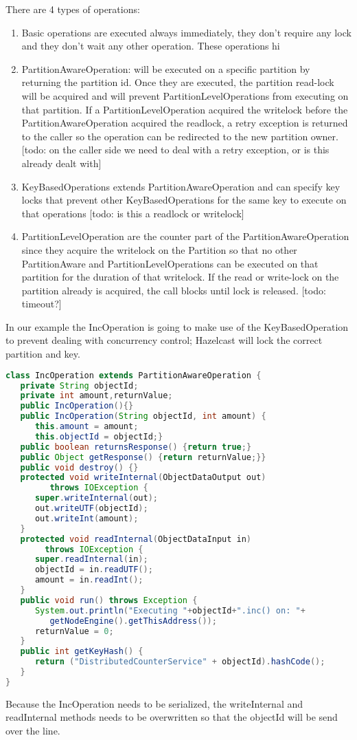 There are 4 types of operations:
\begin{enumerate}
\item Basic operations are executed always immediately, they don't require any lock and they don't wait any other operation. These operations hi
\item PartitionAwareOperation: will be executed on a specific partition by returning the partition id. Once they are executed, the partition read-lock will be acquired and will prevent PartitionLevelOperations from executing on that partition. If a PartitionLevelOperation acquired the writelock before the PartitionAwareOperation acquired the readlock, a retry exception is returned to the caller so the operation can be redirected to the new partition owner. [todo: on the caller side we need to deal with a retry exception, or is this already dealt with]
\item KeyBasedOperations extends PartitionAwareOperation and can specify key locks that prevent other KeyBasedOperations for the same key to execute on that operations [todo: is this a readlock or writelock]
\item PartitionLevelOperation are the counter part of the PartitionAwareOperation since they acquire the writelock on the Partition so that no other PartitionAware and PartitionLevelOperations can be executed on that partition for the duration of that writelock. If the read or write-lock on the partition already is acquired, the call blocks until lock is released. [todo: timeout?]
\end{enumerate}
In our example the IncOperation is going to make use of the KeyBasedOperation to prevent dealing with concurrency control; Hazelcast will lock the correct partition and key. 

\begin{lstlisting}[language=java]
class IncOperation extends PartitionAwareOperation {
   private String objectId;
   private int amount,returnValue;
   public IncOperation(){}
   public IncOperation(String objectId, int amount) {
      this.amount = amount;
      this.objectId = objectId;}
   public boolean returnsResponse() {return true;}
   public Object getResponse() {return returnValue;}}
   public void destroy() {}
   protected void writeInternal(ObjectDataOutput out) 
         throws IOException {
      super.writeInternal(out);
      out.writeUTF(objectId);
      out.writeInt(amount);
   }
   protected void readInternal(ObjectDataInput in) 
        throws IOException {
      super.readInternal(in);
      objectId = in.readUTF();
      amount = in.readInt();
   }
   public void run() throws Exception {
      System.out.println("Executing "+objectId+".inc() on: "+
         getNodeEngine().getThisAddress());            
      returnValue = 0;
   }
   public int getKeyHash() {
      return ("DistributedCounterService" + objectId).hashCode();
   }
}	
\end{lstlisting}
Because the IncOperation needs to be serialized, the writeInternal and readInternal methods needs to be overwritten so that the objectId will be send over the line.

